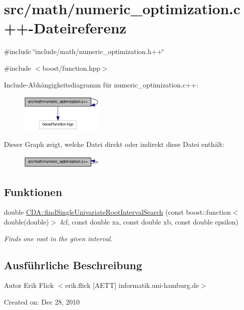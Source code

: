 \hypertarget{numeric__optimization_8c_09_09}{
\section{src/math/numeric\_\-optimization.c++-\/Dateireferenz}
\label{numeric__optimization_8c_09_09}
}
{\ttfamily \#include \char`\"{}include/math/numeric\_\-optimization.h++\char`\"{}}\par
{\ttfamily \#include $<$boost/function.hpp$>$}\par
Include-\/Abhängigkeitsdiagramm für numeric\_\-optimization.c++:\nopagebreak
\begin{figure}[H]
\begin{center}
\leavevmode
\includegraphics[width=116pt]{numeric__optimization_8c_09_09__incl}
\end{center}
\end{figure}
Dieser Graph zeigt, welche Datei direkt oder indirekt diese Datei enthält:\nopagebreak
\begin{figure}[H]
\begin{center}
\leavevmode
\includegraphics[width=116pt]{numeric__optimization_8c_09_09__dep__incl}
\end{center}
\end{figure}
\subsection*{Funktionen}
\begin{DoxyCompactItemize}
\item 
double \hyperlink{namespaceCDA_ab4d6ad3bb6730a396ee12d33fe5ad7ca}{CDA::findSingleUnivariateRootIntervalSearch} (const boost::function$<$ double(double)$>$ \&f, const double xa, const double xb, const double epsilon)
\begin{DoxyCompactList}\small\item\em Finds one root in the given interval. \item\end{DoxyCompactList}\end{DoxyCompactItemize}


\subsection{Ausführliche Beschreibung}
\begin{DoxyAuthor}{Autor}
Erik Flick $<$erik.flick \mbox{[}AETT\mbox{]} informatik.uni-\/hamburg.de$>$
\end{DoxyAuthor}
Created on: Dec 28, 2010 